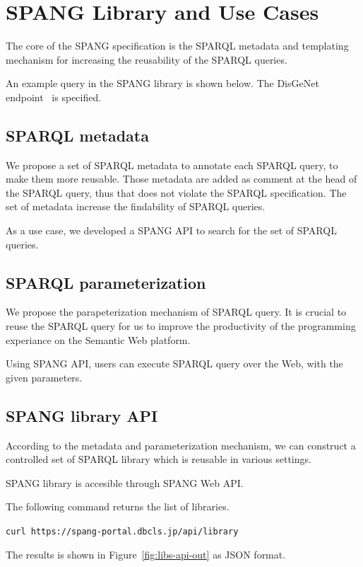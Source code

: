 \documentclass[runningheads]{llncs}
\begin{document}
\section{SPANG Library and Use Cases}

The core of the SPANG specification is the SPARQL metadata and templating mechanism for increasing the reusability of the SPARQL queries.

An example query in the SPANG library is shown below.
The DisGeNet endpoint~\cite{disgenet} is specified.


\subsection{SPARQL metadata}

We propose a set of SPARQL metadata to annotate each SPARQL query, to make them more reusable.
Those metadata are added as comment at the head of the SPARQL query, thus that does not violate the SPARQL specification. 
The set of metadata increase the findability of SPARQL queries.

As a use case, we developed a SPANG API to search for the set of SPARQL queries.

\subsection{SPARQL parameterization}

We propose the parapeterization mechanism of SPARQL query. It is crucial to reuse the SPARQL query for us to improve the productivity of the programming experiance on the Semantic Web platform.

Using SPANG API, users can execute SPARQL query over the Web, with the given parameters.


\subsection{SPANG library API}
According to the metadata and parameterization mechanism, we can construct a controlled set of SPARQL library which is reusable in various settings.

SPANG library is accesible through SPANG Web API.

The following command returns the list of libraries.

\texttt{curl https://spang-portal.dbcls.jp/api/library}

The results is shown in Figure~\ref{fig:libs-api-out} as JSON format.
\end{document}

